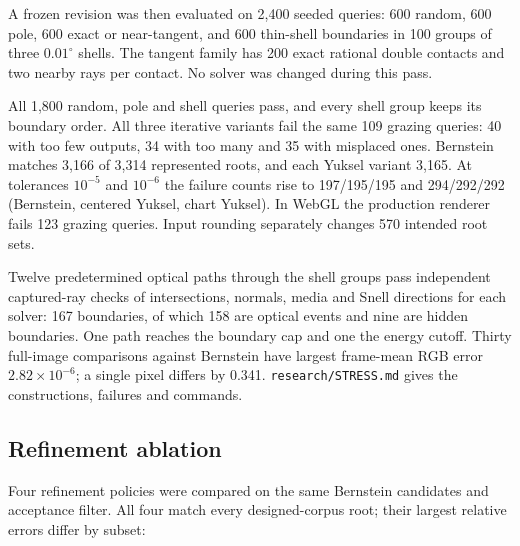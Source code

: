 \documentclass[11pt,a4paper]{article}
\begin{document}
A frozen revision was then evaluated on 2,400 seeded queries: 600
random, 600 pole, 600 exact or near-tangent, and 600 thin-shell
boundaries in 100 groups of three \(0.01^\circ\) shells. The tangent
family has 200 exact rational double contacts and two nearby rays per
contact. No solver was changed during this pass.

All 1,800 random, pole and shell queries pass, and every shell group
keeps its boundary order. All three iterative variants fail the same 109
grazing queries: 40 with too few outputs, 34 with too many and 35 with
misplaced ones. Bernstein matches 3,166 of 3,314 represented roots, and
each Yuksel variant 3,165. At tolerances \(10^{-5}\) and \(10^{-6}\) the
failure counts rise to 197/195/195 and 294/292/292 (Bernstein, centered
Yuksel, chart Yuksel). In WebGL the production renderer fails 123
grazing queries. Input rounding separately changes 570 intended root
sets.

Twelve predetermined optical paths through the shell groups pass
independent captured-ray checks of intersections, normals, media and
Snell directions for each solver: 167 boundaries, of which 158 are
optical events and nine are hidden boundaries. One path reaches the
boundary cap and one the energy cutoff. Thirty full-image comparisons
against Bernstein have largest frame-mean RGB error
\(2.82\times10^{-6}\); a single pixel differs by 0.341.
\texttt{research/STRESS.md} gives the constructions, failures and
commands.

\subsection{Refinement ablation}\label{refinement-ablation}

Four refinement policies were compared on the same Bernstein candidates
and acceptance filter. All four match every designed-corpus root; their
largest relative errors differ by subset:
\end{document}
